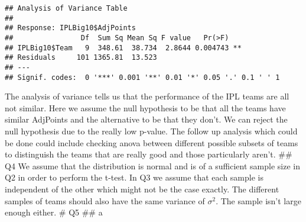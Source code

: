 \documentclass[
]{article}
\newenvironment{Shaded}{\begin{snugshade}}{\end{snugshade}}
\newcommand{\FunctionTok}[1]{\textcolor[rgb]{0.00,0.00,0.00}{#1}}
\newcommand{\NormalTok}[1]{#1}
\newcommand{\OtherTok}[1]{\textcolor[rgb]{0.56,0.35,0.01}{#1}}
\newcommand{\SpecialCharTok}[1]{\textcolor[rgb]{0.00,0.00,0.00}{#1}}
\newcommand{\StringTok}[1]{\textcolor[rgb]{0.31,0.60,0.02}{#1}}
\begin{document}
\begin{Shaded}
\end{Shaded}

\begin{verbatim}
## Analysis of Variance Table
## 
## Response: IPLBig10$AdjPoints
##                Df  Sum Sq Mean Sq F value   Pr(>F)   
## IPLBig10$Team   9  348.61  38.734  2.8644 0.004743 **
## Residuals     101 1365.81  13.523                    
## ---
## Signif. codes:  0 '***' 0.001 '**' 0.01 '*' 0.05 '.' 0.1 ' ' 1
\end{verbatim}

The analysis of variance tells us that the performance of the IPL teams
are all not similar. Here we assume the null hypothesis to be that all
the teams have similar AdjPoints and the alternative to be that they
don't. We can reject the null hypothesis due to the really low p-value.
The follow up analysis which could be done could include checking anova
between different possible subsets of teams to distinguish the teams
that are really good and those particularly aren't. \#\# Q4 We assume
that the distribution is normal and is of a sufficient sample size in Q2
in order to perform the t-test. In Q3 we assume that each sample is
independent of the other which might not be the case exactly. The
different samples of teams should also have the same variance of
\(\sigma^2\). The sample isn't large enough either. \# Q5 \#\# a

\begin{Shaded}
\end{Shaded}
\end{document}
